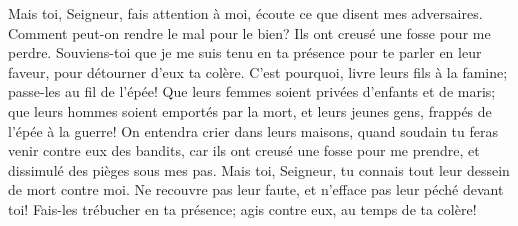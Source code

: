 Mais toi, Seigneur, fais attention à moi,
	écoute ce que disent mes adversaires.
Comment peut-on rendre le mal pour le bien?
	Ils ont creusé une fosse pour me perdre.
Souviens-toi que je me suis tenu en ta présence pour te parler en leur faveur,
	pour détourner d’eux ta colère.
C’est pourquoi, livre leurs fils à la famine; passe-les au fil de l’épée!
	Que leurs femmes soient privées d’enfants et de maris;
	que leurs hommes soient emportés par la mort,
	et leurs jeunes gens, frappés de l’épée à la guerre!
On entendra crier dans leurs maisons,
	quand soudain tu feras venir contre eux des bandits,
	car ils ont creusé une fosse pour me prendre,
	et dissimulé des pièges sous mes pas.
Mais toi, Seigneur, tu connais tout leur dessein de mort contre moi.
Ne recouvre pas leur faute, et n’efface pas leur péché devant toi!
	Fais-les trébucher en ta présence;
	agis contre eux, au temps de ta colère!
